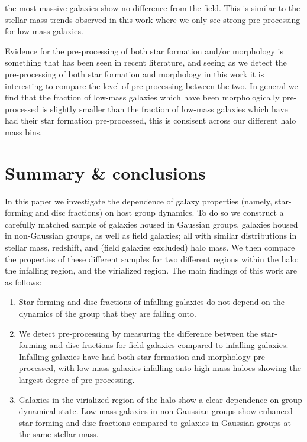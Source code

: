 \documentclass[a4paper,fleqn,usenatbib]{mnras}
\begin{document}
the most massive galaxies
show no difference from the field.  This is similar to the stellar
mass trends observed in this work where we only see strong
pre-processing for low-mass galaxies.
\par
Evidence for the pre-processing of both star formation and/or morphology is
something that has been seen in recent literature, and seeing as we detect the
pre-processing of
both star formation and morphology in this work it is interesting to
compare the level of pre-processing between the two.  In
general we find that the fraction of low-mass galaxies which have been
morphologically pre-processed is slightly smaller than the fraction of
low-mass galaxies which have had their star formation pre-processed,
this is consisent across our different halo mass bins.


\section{Summary \& conclusions}
\label{sec:summary}

In this paper we investigate the dependence of galaxy properties
(namely, star-forming and disc fractions) on host group dynamics.  To
do so we construct a carefully matched sample of galaxies housed in
Gaussian groups, galaxies housed in non-Gaussian groups, as well as
field galaxies; all with similar distributions in stellar mass,
redshift, and (field galaxies excluded) halo mass.  We then compare
the properties of these different samples for two different regions
within the halo: the infalling region, and the virialized region.  The
main findings of this work are as follows:

\begin{enumerate}
  \item Star-forming and disc fractions of infalling galaxies do not
    depend on the dynamics of the group that they are falling onto.

  \item We detect pre-processing by measuring the difference between
    the star-forming and disc fractions for field galaxies compared to
    infalling galaxies.  Infalling galaxies have had both star
    formation and morphology pre-processed, with low-mass galaxies
    infalling onto high-mass haloes showing the largest degree of
    pre-processing.

  \item Galaxies in the virialized region of the halo show a clear
    dependence on group dynamical state.  Low-mass galaxies in
    non-Gaussian groups show enhanced star-forming and disc fractions
    compared to galaxies in Gaussian groups at the same stellar mass. 
\end{enumerate}
\end{document}
